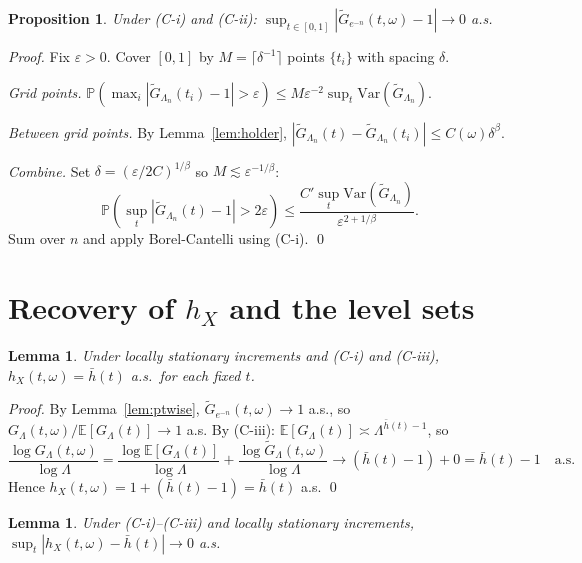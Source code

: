 \documentclass[11pt,a4paper]{article}
\newtheorem{lemma}[theorem]{Lemma}
\newtheorem{proposition}[theorem]{Proposition}
\theoremstyle{definition}
\theoremstyle{remark}
\newcommand{\E}{\mathbb{E}}
\newcommand{\GL}{G_\Lambda}
\newcommand{\hb}{\bar{h}}
\begin{document}
\begin{proposition}\label{prop:unif}
Under (C-i) and (C-ii): $\sup_{t\in[0,1]}|\tilde G_{e^{-n}}(t,\omega)-1|
\to0$ a.s.
\end{proposition}

\begin{proof}
Fix $\varepsilon>0$. Cover $[0,1]$ by $M=\lceil\delta^{-1}\rceil$
points $\{t_i\}$ with spacing $\delta$.

\emph{Grid points.}
$\mathbb{P}(\max_i|\tilde G_{\Lambda_n}(t_i)-1|>\varepsilon)
\le M\varepsilon^{-2}\sup_t\mathrm{Var}(\tilde G_{\Lambda_n})$.

\emph{Between grid points.}
By Lemma~\ref{lem:holder}, $|\tilde G_{\Lambda_n}(t)-\tilde G_{\Lambda_n}(t_i)|
\le C(\omega)\delta^\beta$.

\emph{Combine.}
Set $\delta=(\varepsilon/2C)^{1/\beta}$ so $M\lesssim\varepsilon^{-1/\beta}$:
\[
  \mathbb{P}\!\left(\sup_t|\tilde G_{\Lambda_n}(t)-1|>2\varepsilon\right)
  \le\frac{C'\sup_t\mathrm{Var}(\tilde G_{\Lambda_n})}{\varepsilon^{2+1/\beta}}.
\]
Sum over $n$ and apply Borel-Cantelli using (C-i). \qed
\end{proof}

\section{Recovery of $h_X$ and the level sets}

\begin{lemma}\label{lem:ptrecover}
Under locally stationary increments and (C-i) and (C-iii),
$h_X(t,\omega)=\hb(t)$ a.s.\ for each fixed $t$.
\end{lemma}

\begin{proof}
By Lemma~\ref{lem:ptwise}, $\tilde G_{e^{-n}}(t,\omega)\to1$ a.s.,
so $\GL(t,\omega)/\E[\GL(t)]\to1$ a.s. By (C-iii):
$\E[\GL(t)]\asymp\Lambda^{\hb(t)-1}$, so
\[
  \frac{\log\GL(t,\omega)}{\log\Lambda}
  = \frac{\log\E[\GL(t)]}{\log\Lambda}
  + \frac{\log\tilde G_\Lambda(t,\omega)}{\log\Lambda}
  \to(\hb(t)-1)+0 = \hb(t)-1\quad\text{a.s.}
\]
Hence $h_X(t,\omega)=1+(\hb(t)-1)=\hb(t)$ a.s. \qed
\end{proof}

\begin{lemma}\label{lem:unifrecover}
Under (C-i)--(C-iii) and locally stationary increments,
$\sup_t|h_X(t,\omega)-\hb(t)|\to0$ a.s.
\end{lemma}
\end{document}

